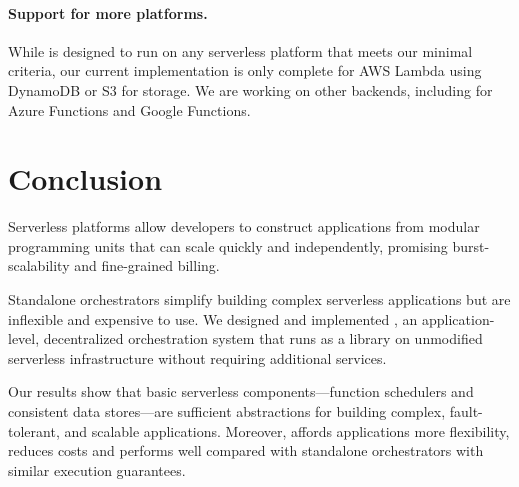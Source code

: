 \paragraph{Support for more platforms.} While \name{} is designed
to run on any serverless platform that meets our minimal criteria, our current
implementation is only complete for AWS Lambda using DynamoDB or S3 for storage.
We are working on other backends, including for Azure Functions and Google
Functions.

\section{Conclusion}\label{sec:conclusion}

Serverless platforms allow developers to construct applications from modular
programming units that can scale quickly and independently, promising
burst-scalability and fine-grained billing. \secondedits
{Standalone orchestrators simplify building complex serverless applications
but are inflexible and expensive to use. We designed and implemented \name
{}, an application-level, decentralized orchestration system that runs as a
library on unmodified serverless infrastructure without requiring additional
services.

Our results show that basic serverless components---function schedulers and
consistent data stores---are sufficient abstractions for building complex,
fault-tolerant, and scalable applications. Moreover, \name{} affords
applications more flexibility, reduces costs and performs well compared with
standalone orchestrators with similar execution guarantees.}

